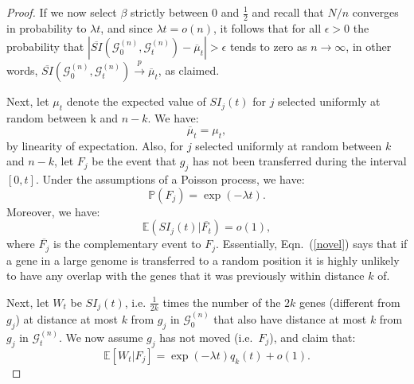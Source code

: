 \documentclass[runningheads, 11pt]{llncs}
\newcommand{\EE}{\mathbb{E}}
\newcommand{\PP}{\mathbb{P}}
\newcommand{\G}{\mathcal{G}^{(n)}}
\begin{document}
\begin{proof}
If we now select $\beta$ strictly between 0 and $\frac{1}{2}$ and recall that
$N/n$ converges in probability to $\lambda t$, {and since $\lambda t=o(n)$,} it
follows that for all $\epsilon>0$ the probability that $|\overline{SI}(\G_0,
\G_t) - \overline{\mu}_t| > \epsilon$ tends to zero as $n \rightarrow \infty$,
in other words, $\overline{SI}(\G_0, \G_t) \xrightarrow{p} \overline{\mu}_t$, as
claimed.



Next, let $\mu_t$ denote the expected value of $SI_j(t)$ for $j$ selected
uniformly at random between k and $n-k$. We have: 
\begin{equation}
\label{mumu}
\overline{\mu}_t= \mu_t,
\end{equation}
by linearity of expectation. Also, for $j$ selected uniformly at random between
$k$ and $n-k$, let $F_j$ be the event that $g_j$ has not been transferred during
the interval $[0,t]$. Under the assumptions of {a Poisson process}, we have:
\begin{equation}
\label{eq2}
\PP(F_j) = \exp(-\lambda t).
\end{equation}
Moreover, we have:
\begin{equation}
\label{novel}
\EE(SI_j(t)|\overline{F_t}) = o(1),
\end{equation}
where $\overline{F_j}$ is the complementary event to $F_j$. Essentially,
Eqn.~(\ref{novel}) says that if a gene in a large genome is transferred to a
random position it is highly unlikely to have any overlap with the genes that it
was previously within distance $k$ of. 


Next, let $W_t$ be {$SI_j(t)$, i.e. $\frac{1}{2k}$ times the number of the $2k$
genes (different from $g_j$) at distance at most $k$ from $g_j$ in $\G_0$ that
also have distance at most $k$ from $g_j$ in $\G_t$}. We {now assume $g_j$ has
not moved (i.e.\ $F_j$), and} claim that:
\begin{equation}
\label{eq3}
\EE[W_t|F_j]= \exp(-\lambda t)q_k(t) +o(1).
\end{equation}



\end{proof}
\end{document}
